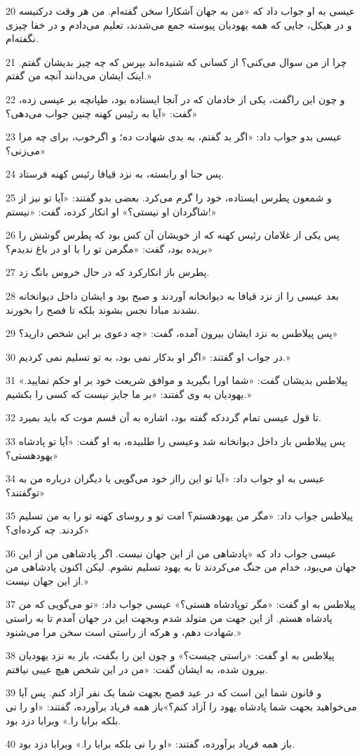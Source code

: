 \par 20 عیسی به او جواب داد که «من به جهان آشکارا سخن گفته‌ام. من هر وقت درکنیسه و در هیکل، جایی که همه یهودیان پیوسته جمع می‌شدند، تعلیم می‌دادم و در خفا چیزی نگفته‌ام.
\par 21 چرا از من سوال می‌کنی؟ از کسانی که شنیده‌اند بپرس که چه چیز بدیشان گفتم. اینک ایشان می‌دانند آنچه من گفتم.»
\par 22 و چون این راگفت، یکی از خادمان که در آنجا ایستاده بود، طپانچه بر عیسی زده، گفت: «آیا به رئیس کهنه چنین جواب می‌دهی؟»
\par 23 عیسی بدو جواب داد: «اگر بد گفتم، به بدی شهادت ده؛ و اگرخوب، برای چه مرا می‌زنی؟»
\par 24 پس حنا او رابسته، به نزد قیافا رئیس کهنه فرستاد.
\par 25 و شمعون پطرس ایستاده، خود را گرم می‌کرد. بعضی بدو گفتند: «آیا تو نیز از شاگردان او نیستی؟» او انکار کرده، گفت: «نیستم!»
\par 26 پس یکی از غلامان رئیس کهنه که از خویشان آن کس بود که پطرس گوشش را بریده بود، گفت: «مگرمن تو را با او در باغ ندیدم؟»
\par 27 پطرس باز انکارکرد که در حال خروس بانگ زد.
\par 28 بعد عیسی را از نزد قیافا به دیوانخانه آوردند و صبح بود و ایشان داخل دیوانخانه نشدند مبادا نجس بشوند بلکه تا فصح را بخورند.
\par 29 پس پیلاطس به نزد ایشان بیرون آمده، گفت: «چه دعوی بر این شخص دارید؟»
\par 30 در جواب او گفتند: «اگر او بدکار نمی بود، به تو تسلیم نمی کردیم.»
\par 31 پیلاطس بدیشان گفت: «شما اورا بگیرید و موافق شریعت خود بر او حکم نمایید.» یهودیان به وی گفتند: «بر ما جایز نیست که کسی را بکشیم.»
\par 32 تا قول عیسی تمام گرددکه گفته بود، اشاره به آن قسم موت که باید بمیرد.
\par 33 پس پیلاطس باز داخل دیوانخانه شد وعیسی را طلبیده، به او گفت: «آیا تو پادشاه یهودهستی؟»
\par 34 عیسی به او جواب داد: «آیا تو این رااز خود می‌گویی یا دیگران درباره من به توگفتند؟»
\par 35 پیلاطس جواب داد: «مگر من یهودهستم؟ امت تو و روسای کهنه تو را به من تسلیم کردند. چه کرده‌ای؟»
\par 36 عیسی جواب داد که «پادشاهی من از این جهان نیست. اگر پادشاهی من از این جهان می‌بود، خدام من جنگ می‌کردند تا به یهود تسلیم نشوم. لیکن اکنون پادشاهی من از این جهان نیست.»
\par 37 پیلاطس به او گفت: «مگر توپادشاه هستی؟» عیسی جواب داد: «تو می‌گویی که من پادشاه هستم. از این جهت من متولد شدم وبجهت این در جهان آمدم تا به راستی شهادت دهم، و هر‌که از راستی است سخن مرا می‌شنود.»
\par 38 پیلاطس به او گفت: «راستی چیست؟» و چون این را بگفت، باز به نزد یهودیان بیرون شده، به ایشان گفت: «من در این شخص هیچ عیبی نیافتم.
\par 39 و قانون شما این است که در عید فصح بجهت شما یک نفر آزاد کنم. پس آیا می‌خواهید بجهت شما پادشاه یهود را آزاد کنم؟»باز همه فریاد برآورده، گفتند: «او را نی بلکه برابا را.» وبرابا دزد بود.
\par 40 باز همه فریاد برآورده، گفتند: «او را نی بلکه برابا را.» وبرابا دزد بود.

